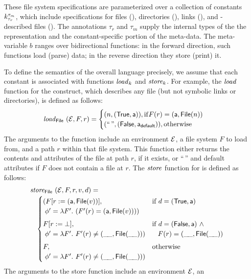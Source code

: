 These file system specifications are parameterized over a collection
of constants $k^{\tau_m}_{\tau_r}$, which include specifications for files (\pfile),
directories (\pdir), links (\plink), and \padshaskell{}-described
files (). The annotations $\tau_r$ and $\tau_m$ supply the
internal types of the the representation and the constant-specific
portion of the meta-data. The meta-variable $b$ ranges over
bidirectional functions: in the forward direction, such functions load
(parse) data; in the reverse direction they store (print) it.

To define the semantics of the overall language precisely,
we assume that each constant is associated with functions
$\mathit{load}_{k}$ and $\mathit{store}_{k}$. For example, the $\mathit{load}_{}$
function for the \pfile{} construct, which describes any file (but not
symbolic links or directories), is defined as follows:
%
\[
\mathit{load}_{\mathsf{File}}~(\mathcal{E},F,r) =
\begin{cases}
  (n,(\mathsf{True},\mathsf{a})), \mathrm{if } F(r) = (\mathsf{a},\mathsf{File}(n)) \\
  (\text{``}{\,}\text{''},(\mathsf{False},\mathsf{a}_{\mathsf{default}})), \mathrm{otherwise}\\
\end{cases}
\]
%
The arguments to the function include an environment $\mathcal{E}$, a file system $F$
to load from, and a path $r$ within that file system.
This function either returns the contents and attributes of the file at path $r$,
if it exists, or ``$\,$'' and default attributes if $F$ does not contain a
file at $r$.  The $\mathit{store}_{}$ function for \pfile{} is
defined as follows:
%
\[
\begin{array}{l}
\mathit{store}_{\mathsf{File}}~(\mathcal{E},F,r,v,d) =\\[.5ex]
\quad 
\begin{cases}
  (F[r := (\mathsf{a},\mathsf{File}(v))],            & \text{if}~d = (\mathsf{True},\mathsf{a})\\
   \; \phi' = \lambda F'.~ (F'(r) = (\mathsf{a},\mathsf{File}(v))))\\[1ex]
  F[r := \bot],                              & \text{if}~d = (\mathsf{False},\mathsf{a})~\wedge\\
   \; \phi' = \lambda F'.~ F'(r) \neq (\_\!\_,\mathsf{File}(\_\!\_))) & \;\;\; F(r) = (\_\!\_,\mathsf{File}(\_\!\_))\\[1ex]
  F,              & \text{otherwise}\\
   \; \phi' = \lambda F'.~ F'(r) \neq (\_\!\_,\mathsf{File}(\_\!\_)))\\
\end{cases}
\end{array}
\]
The arguments to the store function include an environment $\mathcal{E}$, an
